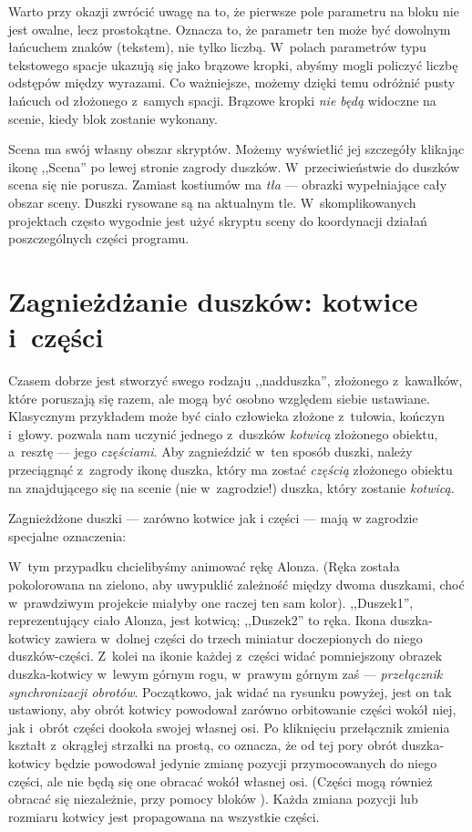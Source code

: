 \documentclass[a4paper]{report}
\begin{document}
Warto przy okazji zwrócić uwagę na to, że pierwsze pole parametru na bloku  nie jest owalne, lecz prostokątne. Oznacza to, że parametr ten może być dowolnym łańcuchem znaków (tekstem), nie tylko liczbą. W~polach parametrów typu tekstowego spacje ukazują się jako brązowe kropki, abyśmy mogli policzyć liczbę odstępów między wyrazami. Co ważniejsze, możemy dzięki temu odróżnić pusty łańcuch od złożonego z~samych spacji. Brązowe kropki \emph{nie będą} widoczne na scenie, kiedy blok zostanie wykonany.

Scena ma swój własny obszar skryptów. Możemy wyświetlić jej szczegóły klikając ikonę ,,Scena'' po lewej stronie zagrody duszków. W~przeciwieństwie do duszków scena się nie porusza. Zamiast kostiumów ma \emph{tła} --- obrazki wypełniające cały obszar sceny. Duszki rysowane są na aktualnym tle. W~skomplikowanych projektach często wygodnie jest użyć skryptu sceny do koordynacji działań poszczególnych części programu.

\section{Zagnieżdżanie duszków: kotwice i~części}
\label{sec:zagnieżdżanie-duszków}

Czasem dobrze jest stworzyć swego rodzaju ,,nadduszka'', złożonego z~kawałków, które poruszają się razem, ale mogą być osobno względem siebie ustawiane. Klasycznym przykładem może być ciało człowieka złożone z~tułowia, kończyn i~głowy. \Snap{} pozwala nam uczynić jednego z~duszków \emph{kotwicą} złożonego obiektu, a~resztę --- jego \emph{częściami}. Aby zagnieździć w~ten sposób duszki, należy przeciągnąć z~zagrody ikonę duszka, który ma zostać \emph{częścią} złożonego obiektu na znajdującego się na scenie (nie w~zagrodzie!) duszka, który zostanie \emph{kotwicą}.

Zagnieżdżone duszki --- zarówno kotwice jak i części --- mają w zagrodzie specjalne oznaczenia:\nopagebreak


W~tym przypadku chcielibyśmy animować rękę Alonza. (Ręka została pokolorowana na zielono, aby uwypuklić zależność między dwoma duszkami, choć w~prawdziwym projekcie miałyby one raczej ten sam kolor). ,,Duszek1'', reprezentujący ciało Alonza, jest kotwicą; ,,Duszek2'' to ręka. Ikona duszka-kotwicy zawiera w~dolnej części do trzech miniatur doczepionych do niego duszków-części. Z~kolei na ikonie każdej z~części widać pomniejszony obrazek duszka-kotwicy w~lewym górnym rogu, w~prawym górnym zaś --- \emph{przełącznik synchronizacji obrotów}. Początkowo, jak widać na rysunku powyżej, jest on tak ustawiony, aby obrót kotwicy powodował zarówno orbitowanie części wokół niej, jak i~obrót części dookoła swojej własnej osi. Po kliknięciu przełącznik zmienia kształt z~okrągłej strzałki na prostą, co oznacza, że od tej pory obrót duszka-kotwicy będzie powodował jedynie zmianę pozycji przymocowanych do niego części, ale nie będą się one obracać wokół własnej osi. (Części mogą również obracać się niezależnie, przy pomocy bloków ). Każda zmiana pozycji lub rozmiaru kotwicy jest propagowana na wszystkie części.
\end{document}
